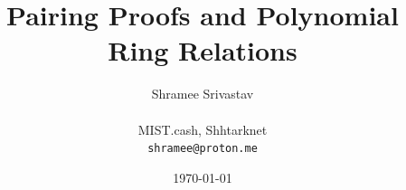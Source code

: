 \documentclass[12pt,a4paper]{article}
\title{Pairing Proofs and Polynomial Ring Relations}
\author{Shramee Srivastav \\
\orcid{0009-0009-7208-3478} \\
MIST.cash, Shhtarknet \\
\texttt{shramee@proton.me}}
\date{\today}
\begin{document}
\maketitle



\tableofcontents
\listofalgorithms
\listoftables











\end{document}
